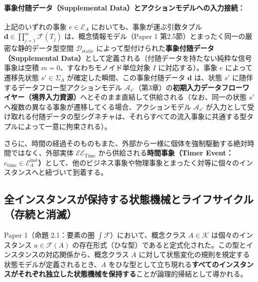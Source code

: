 \documentclass[11pt,a4paper]{ltjsarticle}
\theoremstyle{definition}
\theoremstyle{plain}
\theoremstyle{remark}
\newcommand{\Dstatic}{\mathcal{D}_{\mathrm{static}}}
\begin{document}
\paragraph{事象付随データ（Supplemental Data）とアクションモデルへの入力接続：}
上記のいずれの事象 $e \in \mathcal{E}_A$ においても、事象が運ぶ引数タプル $\mathbf{d} \in \prod_{j=1}^m \mathcal{F}(T_j)$ は、概念情報モデル（Paper 1 第2.5節）とまったく同一の厳密な静的データ型空間 $\Dstatic$ によって型付けられた\textbf{事象付随データ（Supplemental Data）}として定義される（付随データを持たない純粋な信号事象は空積 $m=0$、すなわちモノイド単位対象 $I$ に対応する）。事象 $e$ によって遷移先状態 $s' \in \Sigma_A$ が確定した瞬間、この事象付随データ $\mathbf{d}$ は、状態 $s'$ に随伴するデータフロー型アクションモデル $\mathcal{A}_{s'}$（第3章）の\textbf{初期入力データフローワイヤー（境界入力資源）}へとそのまま直結して供給される（なお、同一の状態 $s'$ へ複数の異なる事象が遷移してくる場合、アクションモデル $\mathcal{A}_{s'}$ が入力として受け取れる付随データの型シグネチャは、それらすべての流入事象に共通する型タプルによって一意に拘束される）。

さらに、時間の経過そのものもまた、外部から一様に個体を強制駆動する絶対時間ではなく、外部実体 $\mathcal{EE}_{\mathrm{Time}}$ から供給される\textbf{時間事象（Timer Event：$e_{\mathrm{time}} \in \mathcal{E}_A^{\mathrm{inst}}$）}として、他のビジネス事象や物理事象とまったく対等に個々のインスタンスへと紐づいて到着する。

\subsection{全インスタンスが保持する状態機械とライフサイクル（存続と消滅）}
Paper 1（命題 2.1：要素の圏 $\int \mathcal{F}$）において、概念クラス $A \in \mathcal{K}$ は個々のインスタンス $a \in \mathcal{F}(A)$ の存在形式（ひな型）であると定式化された。この型とインスタンスの対応関係から、概念クラス $A$ に対して状態変化の規則を規定する状態モデルが定義されるとき、$A$ をひな型として立ち現れる\textbf{すべてのインスタンスがそれぞれ独立した状態機械を保持する}ことが論理的帰結として導かれる。
\end{document}
